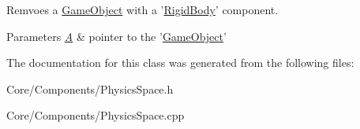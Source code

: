 Remvoes a \hyperlink{classDCEngine_1_1GameObject}{Game\-Object} with a '\hyperlink{classDCEngine_1_1Components_1_1RigidBody}{Rigid\-Body}' component. 


\begin{DoxyParams}{Parameters}
{\em \hyperlink{classA}{A}} & pointer to the '\hyperlink{classDCEngine_1_1GameObject}{Game\-Object}' \\
\hline
\end{DoxyParams}


The documentation for this class was generated from the following files\-:\begin{DoxyCompactItemize}
\item 
Core/\-Components/Physics\-Space.\-h\item 
Core/\-Components/Physics\-Space.\-cpp\end{DoxyCompactItemize}
